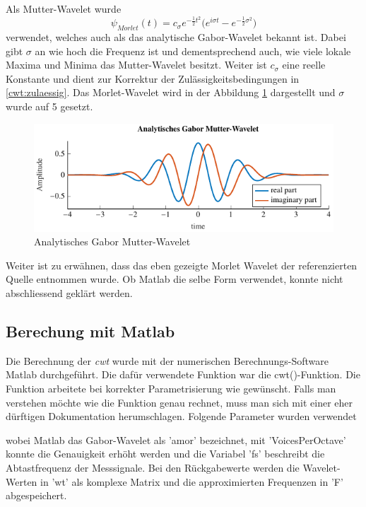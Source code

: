 \begin{refsection}
Als Mutter-Wavelet wurde 
\begin{equation}
\psi_{Morlet}(t) =  c_{\sigma} e^{-\frac{1}{2}t^2} \biggl(e^{i \sigma t}- e^{-\frac{1}{2} \sigma^2} \biggr)
\label{eq:morlet}
\end{equation} \cite{online:Morlet}
verwendet, welches auch als das analytische Gabor-Wavelet bekannt ist.
Dabei gibt $\sigma$ an wie hoch die Frequenz ist und dementsprechend auch, wie viele lokale Maxima und Minima das Mutter-Wavelet besitzt.
Weiter ist $c_{\sigma}$ eine reelle Konstante und dient zur Korrektur der Zulässigkeitsbedingungen in \ref{cwt:zulaessig}.
Das Morlet-Wavelet wird in der Abbildung \ref{fig:gabor_plot} \space dargestellt und $\sigma$ wurde auf 5 gesetzt.

\begin{figure}
\centering
\includegraphics[width=1\textwidth]{papers/wwt/images/gabor.pdf}
\caption{Analytisches Gabor Mutter-Wavelet}
\label{fig:gabor_plot}
\end{figure}

Weiter ist zu erwähnen, dass das eben gezeigte Morlet Wavelet der referenzierten Quelle entnommen wurde. Ob Matlab die selbe Form verwendet, konnte nicht abschliessend geklärt werden.

\subsection{Berechung mit Matlab}
Die Berechnung der \textit{cwt} wurde mit der numerischen Berechnungs-Software Matlab durchgeführt.
Die dafür verwendete Funktion war die cwt()-Funktion.
Die Funktion arbeitete bei korrekter Parametrisierung wie gewünscht.
Falls man verstehen möchte wie die Funktion genau rechnet, muss man sich mit einer eher dürftigen Dokumentation herumschlagen.
Folgende Parameter wurden verwendet

\label{fig:matlab_code_cwt}
wobei Matlab das Gabor-Wavelet als 'amor' bezeichnet, mit 'VoicesPerOctave' konnte die Genauigkeit erhöht werden und die Variabel 'fs' beschreibt die Abtastfrequenz der Messsignale.
Bei den Rückgabewerte werden die Wavelet-Werten in 'wt' als komplexe Matrix und die approximierten Frequenzen in 'F' abgespeichert.


\end{refsection}
